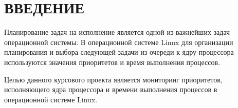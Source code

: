 \chapter*{ВВЕДЕНИЕ}

Планирование задач на исполнение является одной из важнейших задач операционной системы. В операционной системе Linux для организации планирования и выбора следующей задачи из очереди к ядру процессора используются значения приоритетов и время выполнения процессов. 

Целью данного курсового проекта является мониторинг приоритетов, исполняющего ядра процессора и времени выполнения процессов в операционной системе Linux.


